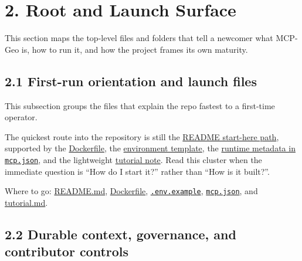 \section{2. Root and Launch Surface}\label{root-and-launch-surface}

This section maps the top-level files and folders that tell a newcomer
what MCP-Geo is, how to run it, and how the project frames its own
maturity.

\subsection{2.1 First-run orientation and launch
files}\label{first-run-orientation-and-launch-files}

This subsection groups the files that explain the repo fastest to a
first-time operator.

The quickest route into the repository is still the
\href{https://github.com/chris-page-gov/mcp-geo/blob/fe862910da246ca77f374cfbe484985f5df4d316/README.md\#L20-L126}{README
start-here path}, supported by the
\href{https://github.com/chris-page-gov/mcp-geo/blob/fe862910da246ca77f374cfbe484985f5df4d316/Dockerfile}{Dockerfile},
the
\href{https://github.com/chris-page-gov/mcp-geo/blob/fe862910da246ca77f374cfbe484985f5df4d316/.env.example}{environment
template}, the
\href{https://github.com/chris-page-gov/mcp-geo/blob/fe862910da246ca77f374cfbe484985f5df4d316/mcp.json}{runtime
metadata in \texttt{mcp.json}}, and the lightweight
\href{https://github.com/chris-page-gov/mcp-geo/blob/fe862910da246ca77f374cfbe484985f5df4d316/tutorial.md}{tutorial
note}. Read this cluster when the immediate question is ``How do I start
it?'' rather than ``How is it built?''.

Where to go:
\href{https://github.com/chris-page-gov/mcp-geo/blob/fe862910da246ca77f374cfbe484985f5df4d316/README.md\#L1-L240}{README.md},
\href{https://github.com/chris-page-gov/mcp-geo/blob/fe862910da246ca77f374cfbe484985f5df4d316/Dockerfile}{Dockerfile},
\href{https://github.com/chris-page-gov/mcp-geo/blob/fe862910da246ca77f374cfbe484985f5df4d316/.env.example}{\texttt{.env.example}},
\href{https://github.com/chris-page-gov/mcp-geo/blob/fe862910da246ca77f374cfbe484985f5df4d316/mcp.json}{\texttt{mcp.json}},
and
\href{https://github.com/chris-page-gov/mcp-geo/blob/fe862910da246ca77f374cfbe484985f5df4d316/tutorial.md}{tutorial.md}.

\subsection{2.2 Durable context, governance, and contributor
controls}\label{durable-context-governance-and-contributor-controls}

